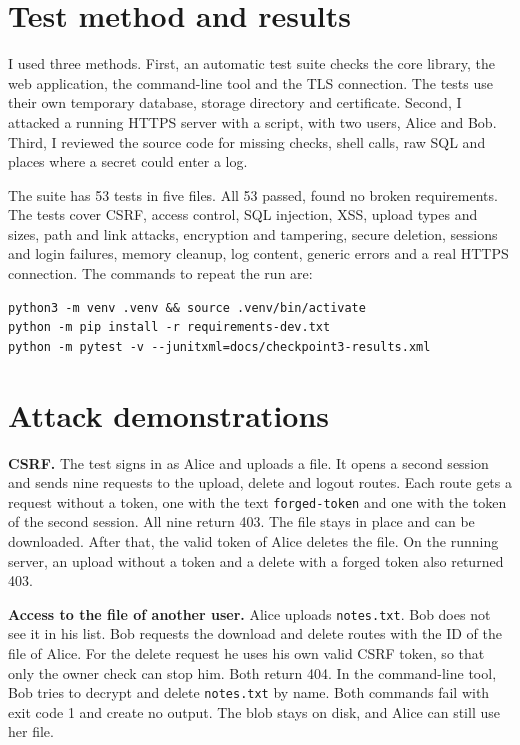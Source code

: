 \section{Test method and results}

I used three methods. First, an automatic test suite checks the core library, the web application, the command-line tool and the TLS connection. The tests use their own temporary database, storage directory and certificate. Second, I attacked a running HTTPS server with a script, with two users, Alice and Bob. Third, I reviewed the source code for missing checks, shell calls, raw SQL and places where a secret could enter a log.

The suite has 53 tests in five files. All 53 passed, found no broken requirements. The tests cover CSRF, access control, SQL injection, XSS, upload types and sizes, path and link attacks, encryption and tampering, secure deletion, sessions and login failures, memory cleanup, log content, generic errors and a real HTTPS connection. The commands to repeat the run are:

\begin{lstlisting}[frame=single, basicstyle=\small, breaklines=true]
python3 -m venv .venv && source .venv/bin/activate
python -m pip install -r requirements-dev.txt
python -m pytest -v --junitxml=docs/checkpoint3-results.xml
\end{lstlisting}

\section{Attack demonstrations}

\textbf{CSRF.} The test signs in as Alice and uploads a file. It opens a second session and sends nine requests to the upload, delete and logout routes. Each route gets a request without a token, one with the text \texttt{forged-token} and one with the token of the second session. All nine return 403. The file stays in place and can be downloaded. After that, the valid token of Alice deletes the file. On the running server, an upload without a token and a delete with a forged token also returned 403.

\textbf{Access to the file of another user.} Alice uploads \texttt{notes.txt}. Bob does not see it in his list. Bob requests the download and delete routes with the ID of the file of Alice. For the delete request he uses his own valid CSRF token, so that only the owner check can stop him. Both return 404. In the command-line tool, Bob tries to decrypt and delete \texttt{notes.txt} by name. Both commands fail with exit code 1 and create no output. The blob stays on disk, and Alice can still use her file.

